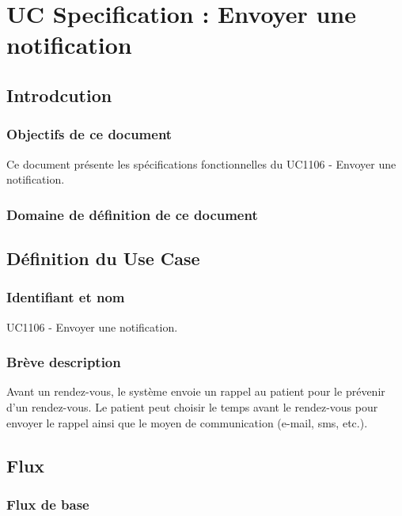 \documentclass[a4paper, 11pt]{report}
\begin{document}

\tableofcontents

\chapter{UC Specification : Envoyer une notification}

\section{Introdcution}

\subsection{Objectifs de ce document}

Ce document présente les spécifications fonctionnelles du UC1106 - Envoyer une notification.

\subsection{Domaine de définition de ce document}

\section{Définition du Use Case}

\subsection{Identifiant et nom}

UC1106 - Envoyer une notification.

\subsection{Brève description}

Avant un rendez-vous, le système envoie un rappel au patient pour le prévenir d'un rendez-vous.
Le patient peut choisir le temps avant le rendez-vous pour envoyer le rappel ainsi que le moyen
de communication (e-mail, sms, etc.).

\section{Flux}

\subsection{Flux de base}
\end{document}
